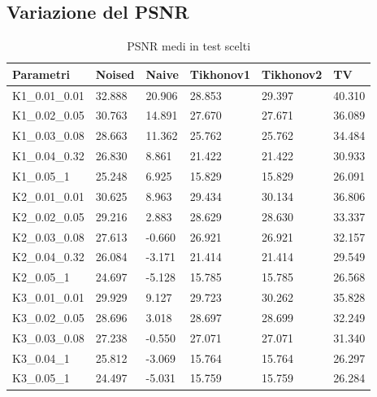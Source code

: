 \documentclass[12pt]{article}
\begin{document}
    \subsection{Variazione del PSNR}
    \begin{table}[!ht]
    \centering
    \begin{tabular}{|l|l|l|l|l|l|}
    \hline
        Parametri & Noised & Naive & Tikhonov1 & Tikhonov2 & TV \\ \hline
        K1\_0.01\_0.01 & 32.888 & 20.906 & 28.853 & 29.397 & 40.310 \\ \hline
        K1\_0.02\_0.05 & 30.763 & 14.891 & 27.670 & 27.671 & 36.089 \\ \hline
        K1\_0.03\_0.08 & 28.663 & 11.362 & 25.762 & 25.762 & 34.484 \\ \hline
        K1\_0.04\_0.32 & 26.830 & 8.861 & 21.422 & 21.422 & 30.933 \\ \hline
        K1\_0.05\_1 & 25.248 & 6.925  & 15.829 & 15.829 & 26.091 \\ \hline
        K2\_0.01\_0.01 & 30.625 & 8.963 & 29.434 & 30.134 & 36.806 \\ \hline
        K2\_0.02\_0.05 & 29.216 & 2.883 & 28.629 & 28.630 & 33.337 \\ \hline
        K2\_0.03\_0.08 & 27.613 & -0.660 & 26.921 & 26.921 & 32.157 \\ \hline
        K2\_0.04\_0.32 & 26.084 & -3.171 & 21.414 & 21.414 & 29.549 \\ \hline
        K2\_0.05\_1 & 24.697 & -5.128 & 15.785 & 15.785 & 26.568 \\ \hline
        K3\_0.01\_0.01 & 29.929 & 9.127 & 29.723 & 30.262 & 35.828 \\ \hline
        K3\_0.02\_0.05 & 28.696 & 3.018 & 28.697 & 28.699 & 32.249 \\ \hline
        K3\_0.03\_0.08 & 27.238 & -0.550 & 27.071 & 27.071 & 31.340 \\ \hline
        K3\_0.04\_1 & 25.812 & -3.069 & 15.764 & 15.764 & 26.297 \\ \hline
        K3\_0.05\_1 & 24.497 & -5.031 & 15.759 & 15.759 & 26.284 \\ \hline
    \end{tabular}
    \caption{PSNR medi in test scelti }
    \label{table:2}
    \end{table}
\end{document}
